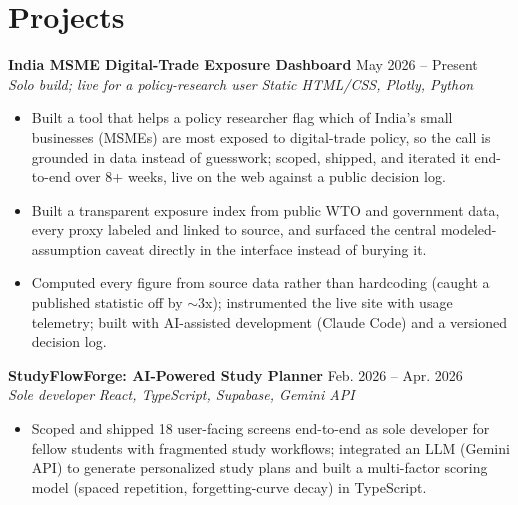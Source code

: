 \documentclass[10pt,letterpaper]{article}
\begin{document}
\section{Projects}
\textbf{India MSME Digital-Trade Exposure Dashboard} \hfill May 2026 -- Present\\
\textit{Solo build; live for a policy-research user} \hfill \textit{Static HTML/CSS, Plotly, Python}\\[2pt]
\begin{itemize}
  \item Built a tool that helps a policy researcher flag which of India's small businesses (MSMEs) are most exposed to digital-trade policy, so the call is grounded in data instead of guesswork; scoped, shipped, and iterated it end-to-end over 8+ weeks, live on the web against a public decision log.
  \item Built a transparent exposure index from public WTO and government data, every proxy labeled and linked to source, and surfaced the central modeled-assumption caveat directly in the interface instead of burying it.
  \item Computed every figure from source data rather than hardcoding (caught a published statistic off by $\sim$3x); instrumented the live site with usage telemetry; built with AI-assisted development (Claude Code) and a versioned decision log.
\end{itemize}
\vspace{2pt}
\textbf{StudyFlowForge: AI-Powered Study Planner} \hfill Feb. 2026 -- Apr. 2026\\
\textit{Sole developer} \hfill \textit{React, TypeScript, Supabase, Gemini API}\\[2pt]
\begin{itemize}
  \item Scoped and shipped 18 user-facing screens end-to-end as sole developer for fellow students with fragmented study workflows; integrated an LLM (Gemini API) to generate personalized study plans and built a multi-factor scoring model (spaced repetition, forgetting-curve decay) in TypeScript.
\end{itemize}
\end{document}
